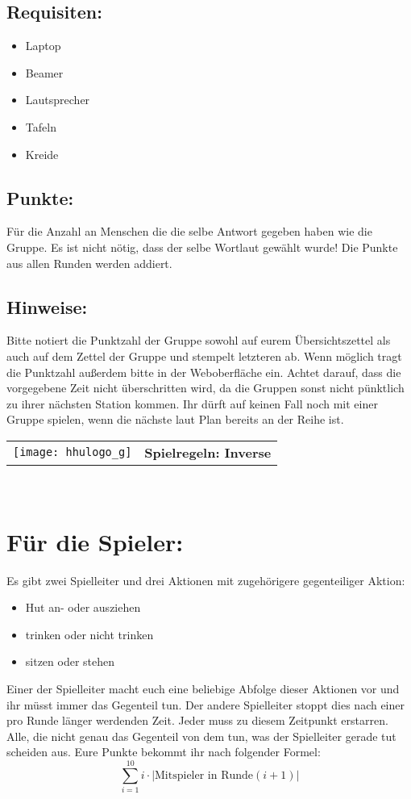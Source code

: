\documentclass[a4paper,10pt]{article}
\def\spiele{Inverse}
\newcommand{\unten}{
 Bitte notiert die Punktzahl der Gruppe sowohl auf eurem Übersichtszettel als auch auf dem Zettel der Gruppe und stempelt letzteren ab. Wenn möglich tragt die Punktzahl außerdem bitte in der Weboberfläche ein.
 Achtet darauf, dass die vorgegebene Zeit nicht überschritten wird, da die Gruppen sonst nicht pünktlich zu ihrer nächsten Station kommen. Ihr dürft auf keinen Fall noch mit einer Gruppe spielen, wenn die nächste laut Plan bereits an der Reihe ist.
}
\begin{document}
\subsection*{Requisiten:} 
\begin{itemize}
 \item Laptop
 \item Beamer
 \item Lautsprecher
 \item Tafeln
 \item Kreide
\end{itemize}

\subsection*{Punkte:}
Für die Anzahl an Menschen die die selbe Antwort gegeben haben wie die Gruppe. Es ist nicht nötig, dass der selbe Wortlaut gewählt wurde! Die Punkte aus allen Runden werden addiert. 

\subsection*{Hinweise:}
\unten

\newpage


  \begin{tabularx}{\textwidth}{lc}
    \texttt{[image: hhulogo\_g]}
  & {\Huge \textbf{Spielregeln: \spiele}}
  \end{tabularx}\\

\Large
\section*{Für die Spieler:}
Es gibt zwei Spielleiter und drei Aktionen mit zugehörigere gegenteiliger Aktion: 
\begin{itemize}
 \item Hut an- oder ausziehen
 \item trinken oder nicht trinken
 \item sitzen oder stehen
\end{itemize}
Einer der Spielleiter macht euch eine beliebige Abfolge dieser Aktionen vor und ihr müsst immer das Gegenteil tun. Der andere Spielleiter stoppt dies nach einer pro Runde länger werdenden Zeit. Jeder muss zu diesem Zeitpunkt erstarren. Alle, die nicht genau das Gegenteil von dem tun, was der Spielleiter gerade tut scheiden aus. Eure Punkte bekommt ihr nach folgender Formel:\\
$$\sum\limits_{i=1}^{10}i \cdot |\mbox{Mitspieler in Runde}  (i+1)|$$
\end{document}
